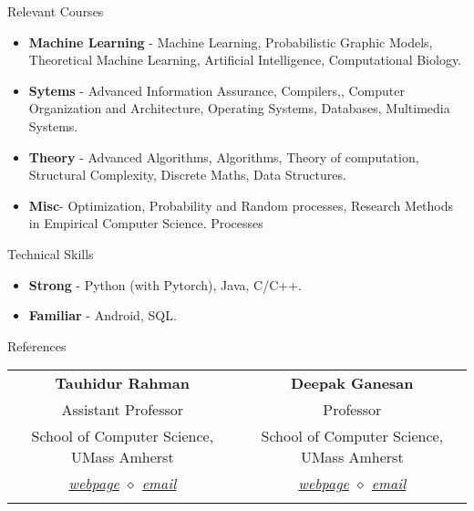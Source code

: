 \documentclass{resume} %
\begin{document}
\vspace*{-1mm}
\begin{rSection}{Relevant Courses}
\begin{itemize}[leftmargin=*]
\itemsep -0.5em 
\item \textbf{Machine Learning} - Machine Learning, Probabilistic Graphic Models, Theoretical Machine Learning, Artificial Intelligence, Computational Biology.
\item \textbf{Sytems} - Advanced Information Assurance, Compilers,, Computer Organization and Architecture, Operating Systems, Databases, Multimedia Systems.
\item \textbf{Theory} - Advanced Algorithms, Algorithms, Theory of computation, Structural Complexity, Discrete Maths, Data Structures. 
\item \textbf{Misc}- Optimization, Probability and Random processes, Research Methods in Empirical Computer Science.
Processes
\end{itemize}
\end{rSection}
\vspace*{-1mm}
\begin{rSection}{Technical Skills}
\begin{itemize}[leftmargin=*]
\itemsep -0.5em 
\item \textbf{Strong} - Python (with Pytorch), Java, C/C++.
\item \textbf{Familiar} - Android, SQL.
\end{itemize}
\end{rSection}
\vspace*{-1mm}


\begin{rSection}{References}
\begin{center}
\begin{tabular}{cc}
\textbf{Tauhidur Rahman} & \textbf{Deepak Ganesan} \\
Assistant Professor & Professor \\
School of Computer Science, UMass Amherst &  School of Computer Science, UMass Amherst \\
\textit{\href{https://www.cse.iitb.ac.in/~pjyothi/}{webpage} $\diamond$ \href{mailto:trahman@cs.umass.edu}{email}}  & \textit{\href{https://people.cs.umass.edu/~dganesan/}{webpage} $\diamond$ \href{mailto:dganesan@cs.umass.edu}{email}}\\
\\


\end{tabular}
\end{center}
\vspace*{-1mm}
\end{rSection}

\end{document}
